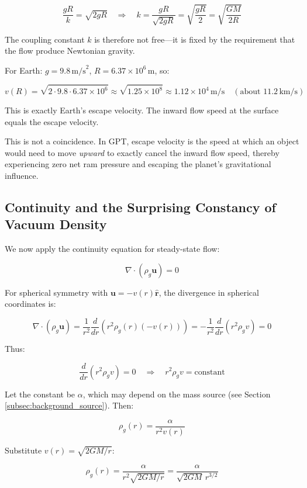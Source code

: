 \documentclass[12pt, a4paper]{article}
\begin{document}
\[
\frac{gR}{k} = \sqrt{2gR} \quad \Rightarrow \quad k = \frac{gR}{\sqrt{2gR}} = \sqrt{\frac{gR}{2}} = \sqrt{\frac{GM}{2R}}
\]

The coupling constant \( k \) is therefore not free—it is fixed by the requirement that the flow produce Newtonian gravity.

For Earth: \( g = 9.8 \, \text{m/s}^2 \), \( R = 6.37 \times 10^6 \, \text{m} \), so:

\[
v(R) = \sqrt{2 \cdot 9.8 \cdot 6.37 \times 10^6} \approx \sqrt{1.25 \times 10^8} \approx 1.12 \times 10^4 \, \text{m/s} \quad (\text{about } 11.2 \, \text{km/s})
\]

This is exactly Earth's escape velocity. The inward flow speed at the surface equals the escape velocity.

This is not a coincidence. In GPT, escape velocity is the speed at which an object would need to move \textit{upward} to exactly cancel the inward flow speed, thereby experiencing zero net ram pressure and escaping the planet's gravitational influence.

\subsection{Continuity and the Surprising Constancy of Vacuum Density}
\label{subsec:continuity_constancy}

We now apply the continuity equation for steady-state flow:

\[
\nabla \cdot (\rho_g \mathbf{u}) = 0
\]

For spherical symmetry with \( \mathbf{u} = -v(r) \hat{\mathbf{r}} \), the divergence in spherical coordinates is:

\[
\nabla \cdot (\rho_g \mathbf{u}) = \frac{1}{r^2} \frac{d}{dr} \left( r^2 \rho_g(r) (-v(r)) \right) = -\frac{1}{r^2} \frac{d}{dr} \left( r^2 \rho_g v \right) = 0
\]

Thus:

\[
\frac{d}{dr} \left( r^2 \rho_g v \right) = 0 \quad \Rightarrow \quad r^2 \rho_g v = \text{constant}
\]

Let the constant be \( \alpha \), which may depend on the mass source (see Section \ref{subsec:background_source}). Then:

\[
\rho_g(r) = \frac{\alpha}{r^2 v(r)}
\]

Substitute \( v(r) = \sqrt{2GM/r} \):

\[
\rho_g(r) = \frac{\alpha}{r^2 \sqrt{2GM/r}} = \frac{\alpha}{\sqrt{2GM} \, r^{3/2}}
\]
\end{document}
